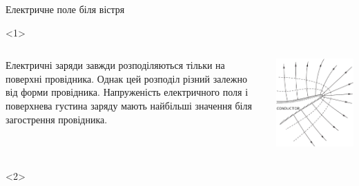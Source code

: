 \documentclass{beamer}
\begin{document}
\begin{frame}{Електричне поле біля вістря}{}
	\begin{onlyenv}
		\begin{columns}
			\begin{column}{0.6\linewidth}
				\begin{block}{}\justifying
					Електричні заряди завжди розподіляються тільки на поверхні провідника. Однак цей
					розподіл різний залежно від форми провідника. \alert{Напруженість електричного поля
						і поверхнева густина заряду мають найбільші значення біля загострення
						провідника}.
				\end{block}
			\end{column}
			\begin{column}{0.4\linewidth}\centering
				\includegraphics[width=\linewidth]{tip.pdf}
			\end{column}
		\end{columns}
	\end{onlyenv}
	\begin{onlyenv}
		\begin{block}{}\justifying

\end{block}
\end{onlyenv}
\end{frame}
\end{document}
